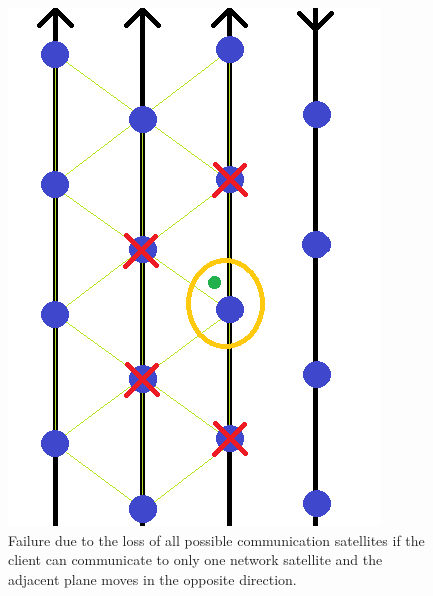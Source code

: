 \documentclass[12pt,a4paper]{report}
\begin{document}
\begin{figure}[H]
\begin{center}
\includegraphics[scale=0.5]{critical1C.PNG}
\caption[1 communication failure counter-direction]{Failure due to the loss of all possible communication satellites if the client can communicate to only one network satellite and the adjacent plane moves in the opposite direction.}
\label{fig:critical1C}
\end{center}
\end{figure}
\end{document}

